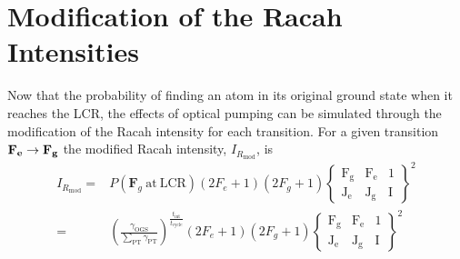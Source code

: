 \section{Modification of the Racah Intensities}
Now that the probability of finding an atom in its original ground state when it reaches the LCR, the effects of optical pumping can be simulated through the modification of the Racah intensity for each transition. For a given transition $\bf{F}_e \rightarrow \bf{F}_g$ the modified Racah intensity, $I_{R_{\mathrm{mod}}}$, is 
\begin{align}
I_{R_{\mathrm{mod}}} =& P(\mathbf{F}_g\ \mathrm{at\ LCR})
(2F_e+1)(2F_g+1)
\left\lbrace
\mathrm{
\begin{matrix}
F_g & F_e & 1\\
J_e & J_g & \mathrm{I} 
\end{matrix}
}
\right\rbrace^2\\
=& \left(\frac{\gamma_{\mathrm{OGS}}}{\sum_{\mathrm{PT}}\gamma_{\mathrm{PT}}}\right)^{\frac{t_{\mathrm{int}}}{t_{\mathrm{cycle}}}}
(2F_e+1)(2F_g+1)
\left\lbrace
\mathrm{
\begin{matrix}
F_g & F_e & 1\\
J_e & J_g & \mathrm{I} 
\end{matrix}
}
\right\rbrace^2
\end{align}